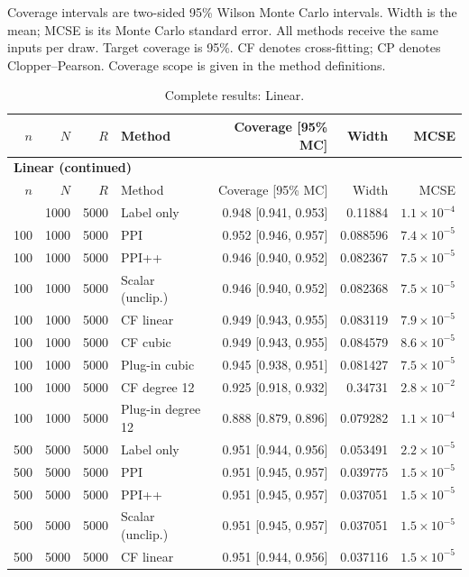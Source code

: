 Coverage intervals are two-sided 95\% Wilson Monte Carlo intervals. Width is the mean; MCSE is its Monte Carlo standard error. All methods receive the same inputs per draw. Target coverage is 95\%. CF denotes cross-fitting; CP denotes Clopper--Pearson. Coverage scope is given in the method definitions.
{\setlength{\tabcolsep}{3pt}\begin{longtable}{rrrlrrr}
\caption{Complete results: Linear.}\\
\toprule $n$ & $N$ & $R$ & Method & Coverage [95\% MC] & Width & MCSE \\
\midrule\endfirsthead
\multicolumn{7}{l}{\textbf{Linear (continued)}}\\
\toprule $n$ & $N$ & $R$ & Method & Coverage [95\% MC] & Width & MCSE \\
\midrule\endhead
\bottomrule\endfoot
100 & 1000 & 5000 & Label only & 0.948 [0.941, 0.953] & 0.11884 & $1.1\times 10^{-4}$ \\
100 & 1000 & 5000 & PPI & 0.952 [0.946, 0.957] & 0.088596 & $7.4\times 10^{-5}$ \\
100 & 1000 & 5000 & PPI++ & 0.946 [0.940, 0.952] & 0.082367 & $7.5\times 10^{-5}$ \\
100 & 1000 & 5000 & Scalar (unclip.) & 0.946 [0.940, 0.952] & 0.082368 & $7.5\times 10^{-5}$ \\
100 & 1000 & 5000 & CF linear & 0.949 [0.943, 0.955] & 0.083119 & $7.9\times 10^{-5}$ \\
100 & 1000 & 5000 & CF cubic & 0.949 [0.943, 0.955] & 0.084579 & $8.6\times 10^{-5}$ \\
100 & 1000 & 5000 & Plug-in cubic & 0.945 [0.938, 0.951] & 0.081427 & $7.5\times 10^{-5}$ \\
100 & 1000 & 5000 & CF degree 12 & 0.925 [0.918, 0.932] & 0.34731 & $2.8\times 10^{-2}$ \\
100 & 1000 & 5000 & Plug-in degree 12 & 0.888 [0.879, 0.896] & 0.079282 & $1.1\times 10^{-4}$ \\
500 & 5000 & 5000 & Label only & 0.951 [0.944, 0.956] & 0.053491 & $2.2\times 10^{-5}$ \\
500 & 5000 & 5000 & PPI & 0.951 [0.945, 0.957] & 0.039775 & $1.5\times 10^{-5}$ \\
500 & 5000 & 5000 & PPI++ & 0.951 [0.945, 0.957] & 0.037051 & $1.5\times 10^{-5}$ \\
500 & 5000 & 5000 & Scalar (unclip.) & 0.951 [0.945, 0.957] & 0.037051 & $1.5\times 10^{-5}$ \\
500 & 5000 & 5000 & CF linear & 0.951 [0.944, 0.956] & 0.037116 & $1.5\times 10^{-5}$ \\

\end{longtable}}
